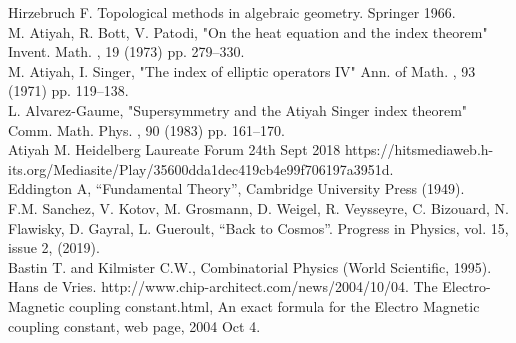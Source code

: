 \documentclass[a4paper,9pt]{article}
\begin{document}
\begin{thebibliography}{99}
 Hirzebruch F. Topological methods in algebraic geometry. Springer 1966.\\
 M. Atiyah, R. Bott, V. Patodi, "On the heat equation and the index theorem" Invent. Math. , 19 (1973) pp. 279--330.\\
 M. Atiyah, I. Singer, "The index of elliptic operators IV" Ann. of Math. , 93 (1971) pp. 119--138. \\
 L. Alvarez-Gaume, "Supersymmetry and the Atiyah Singer index theorem" Comm. Math. Phys. , 90 (1983) pp. 161--170.\\
 Atiyah M. Heidelberg Laureate Forum 24th Sept 2018 https://hitsmediaweb.h-its.org/Mediasite/Play/35600dda1dec419cb4e99f706197a3951d. \\ 
 Eddington A, ``Fundamental Theory'', Cambridge University Press (1949).\\
 F.M. Sanchez, V. Kotov, M. Grosmann, D. Weigel, R. Veysseyre, C. Bizouard, N. Flawisky, D. Gayral, L. Gueroult, ``Back to Cosmos''. Progress in Physics, vol. 15, issue 2, (2019).\\ 
 Bastin T. and Kilmister C.W., Combinatorial Physics (World Scientific, 1995).\\
 Hans de Vries. http://www.chip-architect.com/news/2004/10/04. The Electro-Magnetic coupling constant.html, An exact formula for the Electro Magnetic coupling constant, web page, 2004 Oct 4.\\ 


\end{thebibliography}
\end{document}
